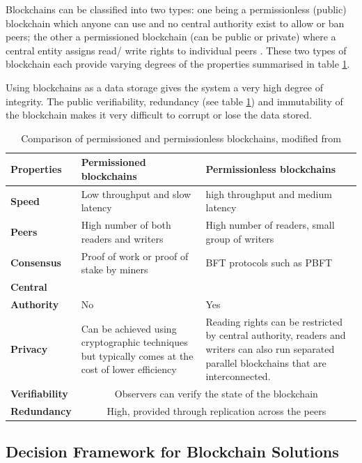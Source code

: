 Blockchains can be classified into two types: one being a permissionless (public) blockchain which anyone can 
use and no central authority exist to allow or ban peers; the other a permissioned blockchain (can be public or private)
where a central entity assigns read/ write rights to individual peers \citep[p.1]{wust2017you}. These two types of 
blockchain each provide varying degrees of the properties summarised in table \ref{table:permvsless}.

Using blockchains as a data storage gives the system a very high degree of integrity. The public verifiability, 
redundancy (see table \ref{table:permvsless}) and immutability of the blockchain makes it very difficult to 
corrupt or lose the data stored.

\begin{table}[!h] 
    \caption{Comparison of permissioned and permissionless blockchains, modified from \citet[p.3]{wust2017you}}
    \centering
    \label{table:permvsless}
    \begin{tabularx}{\textwidth}{>{\bfseries}lXX}
        Properties & Permissioned blockchains & Permissionless blockchains\\
        \toprule
        Speed & Low throughput and slow latency & high throughput and medium latency\\\midrule
        Peers & High number of both readers and writers & High number of readers, small group of writers\\\midrule
        Consensus & Proof of work or proof of stake by miners & BFT protocols such as PBFT\\\midrule
        Central\\Authority & No & Yes\\\midrule
        Privacy & Can be achieved using cryptographic techniques but typically comes at the cost of lower efficiency & 
        Reading rights can be restricted by central authority, readers and writers can also run separated parallel blockchains that are interconnected. \\\midrule
        Verifiability & \multicolumn{2}{c}{Observers can verify the state of the blockchain} \\\midrule
        Redundancy & \multicolumn{2}{c}{High, provided through replication across the peers}
        \\\bottomrule
    \end{tabularx}
\end{table}

\subsection{Decision Framework for Blockchain Solutions}

